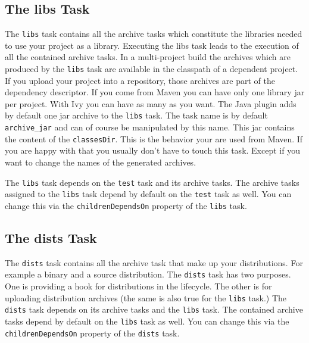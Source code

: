 \subsection{The libs Task} %
\label{sub:the_libs_task}
The \texttt{libs} task contains all the archive tasks which constitute the libraries needed to use your project as a library. Executing the libs task leads to the execution of all the contained archive tasks. In a multi-project build the archives which are produced by the \texttt{libs} task are available in the classpath of a dependent project. If you upload your project into a repository, those archives are part of the dependency descriptor. If you come from Maven you can have only one library jar per project. With Ivy you can have as many as you want. 
The Java plugin adds by default one jar archive to the \texttt{libs} task. The task name is by default \texttt{archive\_jar} and can of course be manipulated by this name. This jar contains the content of the \texttt{classesDir}. This is the behavior your are used from Maven. If you are happy with that you usually don't have to touch this task. Except if you want to change the names of the generated archives. 

The \texttt{libs} task depends on the \texttt{test} task and its archive tasks. The archive tasks assigned to the \texttt{libs} task depend by default on the \texttt{test} task as well. You can change this via the \texttt{childrenDependsOn} property of the \texttt{libs} task. 
\subsection{The dists Task} %
\label{sub:the_dists_task}
The \texttt{dists} task contains all the archive task that make up your distributions. For example a binary and a source distribution. The \texttt{dists} task has two purposes. One is providing a hook for distributions in the lifecycle. The other is for uploading distribution archives (the same is also true for the \texttt{libs} task.) The \texttt{dists} task depends on its archive tasks and the \texttt{libs} task. The contained archive tasks depend by default on the \texttt{libs} task as well. You can change this via the \texttt{childrenDependsOn} property of the \texttt{dists} task. 
